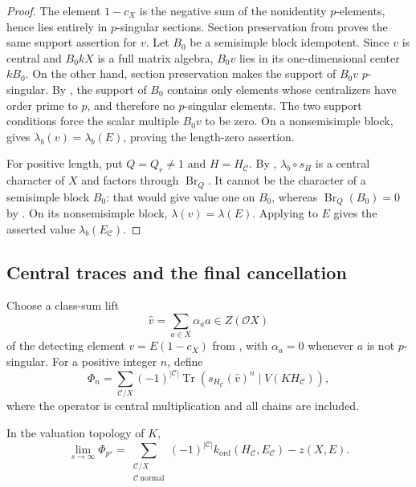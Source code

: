 \begin{proof}
The element $1-c_X$ is the negative sum of the nonidentity
$p$-elements, hence lies entirely in $p$-singular sections.
Section preservation from  proves the same
support assertion for $v$. Let $B_0$ be a semisimple block
idempotent. Since $v$ is central and $B_0kX$ is a full matrix
algebra, $B_0v$ lies in its one-dimensional center $kB_0$.
On the other hand, section preservation makes the support of $B_0v$
$p$-singular. By , the support
of $B_0$ contains only elements whose centralizers have order prime
to $p$, and therefore no $p$-singular elements. The two support
conditions force the scalar multiple $B_0v$ to be zero.
On a nonsemisimple block,
 gives
$\lambda_b(v)=\lambda_b(E)$, proving the length-zero assertion.

For positive length, put $Q=Q_r\ne1$ and $H=H_{\mathcal C}$.
By , $\lambda_b\circ s_H$ is a
central character of $X$ and factors through
$\operatorname{Br}_Q$. It cannot be the character of a
semisimple block $B_0$: that would give value one on $B_0$,
whereas $\operatorname{Br}_Q(B_0)=0$ by
. On its nonsemisimple block,
$\lambda(v)=\lambda(E)$. Applying
 to $E$ gives the asserted value
$\lambda_b(E_{\mathcal C})$.
\end{proof}

\subsection{Central traces and the final cancellation}

Choose a class-sum lift
\[
 \widehat v=\sum_{a\in X}\alpha_a a\in Z(\mathcal O X)
\]
of the detecting element $v=E(1-c_X)$ from
, with $\alpha_a=0$ whenever $a$ is
not $p$-singular.
For a positive integer $n$, define
\begin{equation}\label{eq:chain-trace}
 \Phi_n=
 \sum_{\mathcal C/X}(-1)^{|\mathcal C|}
 \operatorname{Tr}\left(
    s_{H_{\mathcal C}}(\widehat v)^n
       \mid V(KH_{\mathcal C})\right),
\end{equation}
where the operator is central multiplication and all chains are
included.

\begin{lemma}\label{lem:trace-limit}
In the valuation topology of $K$,
\begin{equation}\label{eq:trace-limit}
 \lim_{s\to\infty}\Phi_{p^s}
 =
 \sum_{\substack{\mathcal C/X\\\mathcal C\ \mathrm{normal}}}
 (-1)^{|\mathcal C|}k_{\mathrm{ord}}(H_{\mathcal C},E_{\mathcal C})
 -z(X,E).
\end{equation}
\end{lemma}

